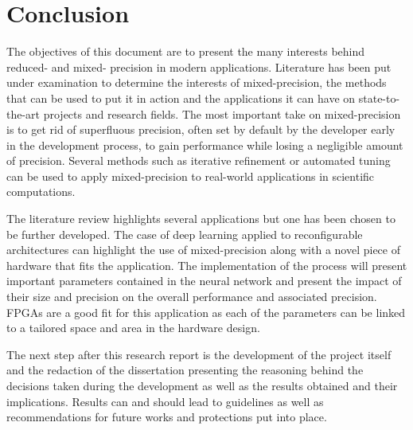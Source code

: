 \chapter{Conclusion}

\label{Chapter10} %


The objectives of this document are to present the many interests behind reduced- and mixed- precision in modern applications. Literature has been put under examination to determine the interests of mixed-precision, the methods that can be used to put it in action and the applications it can have on state-to-the-art projects and research fields. The most important take on mixed-precision is to get rid of superfluous precision, often set by default by the developer early in the development process, to gain performance while losing a negligible amount of precision. Several methods such as iterative refinement or automated tuning can be used to apply mixed-precision to real-world applications in scientific computations.

The literature review highlights several applications but one has been chosen to be further developed. The case of deep learning applied to reconfigurable architectures can highlight the use of mixed-precision along with a novel piece of hardware that fits the application. The implementation of the process will present important parameters contained in the neural network and present the impact of their size and precision on the overall performance and associated precision. FPGAs are a good fit for this application as each of the parameters can be linked to a tailored space and area in the hardware design.

The next step after this research report is the development of the project itself and the redaction of the dissertation presenting the reasoning behind the decisions taken during the development as well as the results obtained and their implications. Results can and should lead to guidelines as well as recommendations for future works and protections put into place.
